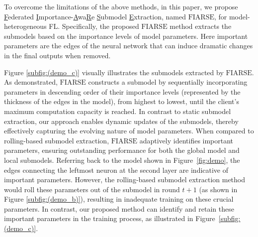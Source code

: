 \documentclass{article}
\theoremstyle{plain}
\theoremstyle{definition}
\theoremstyle{remark}
\newcommand{\algo}{\ensuremath{\text{FIARSE}}\xspace}
\begin{document}
To overcome the limitations of the above methods, in this paper, we propose \underline{F}ederated \underline{I}mportance-\underline{A}wa\underline{R}e \underline{S}ubmodel \underline{E}xtraction, named \algo, for model-heterogeneous FL. Specifically, the proposed \algo method extracts the submodels based on the importance levels of model parameters. Here important parameters are the edges of the neural network that can induce dramatic changes in the final outputs when removed. 

Figure \ref{subfig:(demo_c)} visually illustrates the submodels extracted by \algo. As demonstrated, \algo constructs a submodel by sequentially incorporating parameters in descending order of their importance levels (represented by the thickness of the edges in the model), from highest to lowest, until the client’s maximum computation capacity is reached. In contrast to static submodel extraction, our approach enables dynamic updates of the submodels, thereby effectively capturing the evolving nature of model parameters. When compared to rolling-based submodel extraction, \algo adaptively identifies important parameters, ensuring outstanding performance for both the global model and local submodels. Referring back to the model shown in Figure~\ref{fig:demo}, the edges connecting the leftmost neuron at the second layer are indicative of important parameters. However, the rolling-based submodel extraction method would roll these parameters out of the submodel in round $t+1$ (as shown in Figure \ref{subfig:(demo_b)}), resulting in inadequate training on these crucial parameters. In contrast, our proposed method can identify and retain these important parameters in the training process, as illustrated in Figure~\ref{subfig:(demo_c)}.

\end{document}
